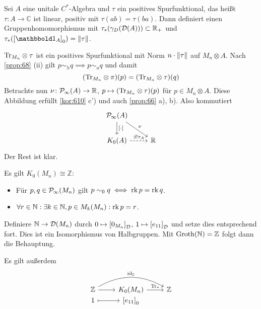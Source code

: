 \begin{proposition}[label=prop:616]
	Sei $A$ eine unitale $C^*$-Algebra und $\tau$ ein positives Spurfunktional, das heißt $\tau \colon A \to \mathbb{C}$ ist linear, positiv mit $\tau(ab) =\tau(ba)$.
	Dann definiert 
	einen Gruppenhomomorphismus mit $\tau_*\enbrace*{\gamma_D \enbrace*{\mathcal{D}(A)}} \subset \mathbb{R}_+$ und $\tau_* \enbrace*{\benbrace*{\ind_A}_0} = \norm*{\tau}$.
\end{proposition}
\begin{beweis}
	${\Tr_{M_n}} \otimes \tau$ ist ein positives Spurfunktional mit Norm $n \cdot \norm*{\tau}$ auf $M_n \otimes A$.
	Nach \autoref{prop:68} (ii) gilt $p \sim_h q \implies p \sim_u q$ und damit
	\[
		\enbrace*{{\Tr_{M_n}} \otimes \pi}(p) = \enbrace*{{\Tr_{M_n}} \otimes \tau} (q)
	\]
	Betrachte nun $\nu \colon \Pinfty(A) \to \mathbb{R}$, $p \mapsto \enbrace*{{\Tr_{M_n}} \otimes \tau}(p)$ für $p \in M_n \otimes A$.
	Diese Abbildung erfüllt \autoref{kor:610} c') und auch \autoref{prop:66} a), b).
	Also kommutiert
	\[
		\begin{tikzcd}
			\Pinfty(A) \dar["\benbrace*{\cdot}"] \drar["\nu"] \\
			K_0(A) \rar[dashed,"\exists! \tau_A"] & \mathbb{R}
		\end{tikzcd}
	\]
	Der Rest ist klar.
\end{beweis}

\begin{beispiel}[label=bsp:617]
	Es gilt $K_0(M_n) \cong \mathbb{Z}$:
	\begin{itemize}
		\item Für $p,q \in \Pinfty(M_n)$ gilt $p \sim_0 q \iff \rk p = \rk q$.
		\item $\forall r \in \mathbb{N} : \exists k \in \mathbb{N}, p \in M_k(M_n) : \rk p = r$. 
	\end{itemize}
	Definiere $\mathbb{N} \to \mathcal{D} \enbrace*{M_n}$ durch $0 \mapsto \benbrace*{0_{M_n}}_{\mathcal{D}}$, $1 \mapsto \benbrace*{e_{11}}_{\mathcal{D}}$ und setze dies entsprechend fort.
	Dies ist ein Isomorphismus von Halbgruppen.
	Mit $\Groth(\mathbb{N}) = \mathbb{Z}$ folgt dann die Behauptung.
	
	Es gilt außerdem
	\[
		\begin{tikzcd}
			\mathbb{Z} \rar \ar[rr,bend left,"\id_\mathbb{Z}"] & K_0(M_n) \rar["\Tr_*"] & \mathbb{Z} \\[-2em]
			1 \rar[mapsto] & \benbrace*{e_{11}}_0 & 
		\end{tikzcd}
	\]
\end{beispiel}

